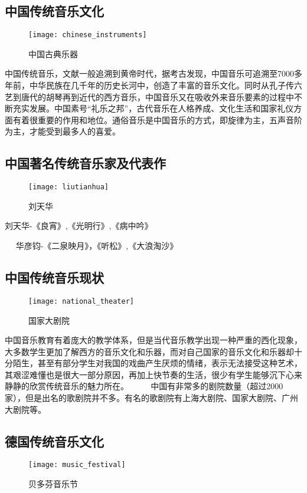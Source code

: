 \subsection{中国传统音乐文化}
\begin{figure}[htb]
    \centering
    \texttt{[image: chinese\_instruments]}
    \caption{中国古典乐器}
\end{figure}

    中国传统音乐，文献一般追溯到黄帝时代，据考古发现，中国音乐可追溯至7000多年前，中华民族在几千年的历史长河中，创造了丰富的音乐文化。同时从孔子传六艺到唐代的胡琴再到近代的西方音乐，中国音乐又在吸收外来音乐要素的过程中不断充实发展。中国素号“礼乐之邦”，古代音乐在人格养成、文化生活和国家礼仪方面有着很重要的作用和地位。通俗音乐是中国音乐的方式，即旋律为主，五声音阶为主，才能受到最多人的喜爱。 

\subsection{中国著名传统音乐家及代表作}
\begin{figure}[htb]
    \centering
    \texttt{[image: liutianhua]}
    \caption{刘天华}
\end{figure}
    刘天华-《良宵》,《光明行》,《病中吟》 

    华彦钧-《二泉映月》，《听松》,《大浪淘沙》 

\subsection{中国传统音乐现状}
\begin{figure}[htb]
    \centering
    \texttt{[image: national\_theater]}
    \caption{国家大剧院}
\end{figure}

    中国音乐教育有着庞大的教学体系，但是当代音乐教学出现一种严重的西化现象，大多数学生更加了解西方的音乐文化和乐器，而对自己国家的音乐文化和乐器却十分陌生，甚至有部分学生对我国的戏曲产生厌烦的情绪，表示无法接受这种艺术，其艰涩难懂也是很大一部分原因，再加上快节奏的生活，很少有学生能够沉下心来静静的欣赏传统音乐的魅力所在。 
    
    中国有非常多的剧院数量（超过2000家），但是出名的歌剧院并不多。有名的歌剧院有上海大剧院、国家大剧院、广州大剧院等。 

\subsection{德国传统音乐文化}
\begin{figure}[htb]
    \centering
    \texttt{[image: music\_festival]}
    \caption{贝多芬音乐节}
\end{figure}
    
